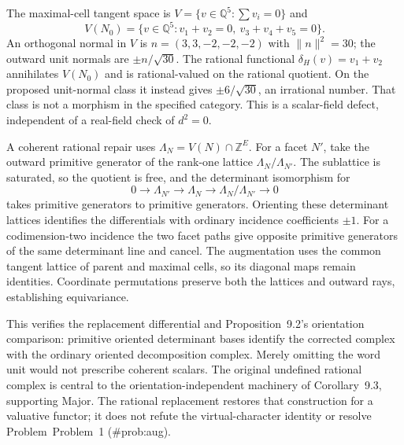 \documentclass[10pt]{article}
\begin{document}
The maximal-cell tangent space is \(V=\{v\in\mathbb Q^5:\sum v_i=0\}\) and \[V(N_0)=\{v\in\mathbb Q^5:v_1+v_2=0,\ v_3+v_4+v_5=0\}.\] An orthogonal normal in \(V\) is \(n=(3,3,-2,-2,-2)\) with \(\|n\|^2=30\); the outward unit normals are \(\pm n/\sqrt{30}\). The rational functional \(\delta_H(v)=v_1+v_2\) annihilates \(V(N_0)\) and is rational-valued on the rational quotient. On the proposed unit-normal class it instead gives \(\pm6/\sqrt{30}\), an irrational number. That class is not a morphism in the specified category. This is a scalar-field defect, independent of a real-field check of \(d^2=0\).\par
A coherent rational repair uses \(\Lambda_N=V(N)\cap\mathbb Z^E\). For a facet \(N'\), take the outward primitive generator of the rank-one lattice \(\Lambda_N/\Lambda_{N'}\). The sublattice is saturated, so the quotient is free, and the determinant isomorphism for \[0\longrightarrow\Lambda_{N'}\longrightarrow\Lambda_N
 \longrightarrow\Lambda_N/\Lambda_{N'}\longrightarrow0\] takes primitive generators to primitive generators. Orienting these determinant lattices identifies the differentials with ordinary incidence coefficients \(\pm1\). For a codimension-two incidence the two facet paths give opposite primitive generators of the same determinant line and cancel. The augmentation uses the common tangent lattice of parent and maximal cells, so its diagonal maps remain identities. Coordinate permutations preserve both the lattices and outward rays, establishing equivariance.\par
This verifies the replacement differential and Proposition 9.2’s orientation comparison: primitive oriented determinant bases identify the corrected complex with the ordinary oriented decomposition complex. Merely omitting the word unit would not prescribe coherent scalars. The original undefined rational complex is central to the orientation-independent machinery of Corollary 9.3, supporting Major. The rational replacement restores that construction for a valuative functor; it does not refute the virtual-character identity or resolve Problem Problem 1 (\#prob:aug).\par
\end{document}
